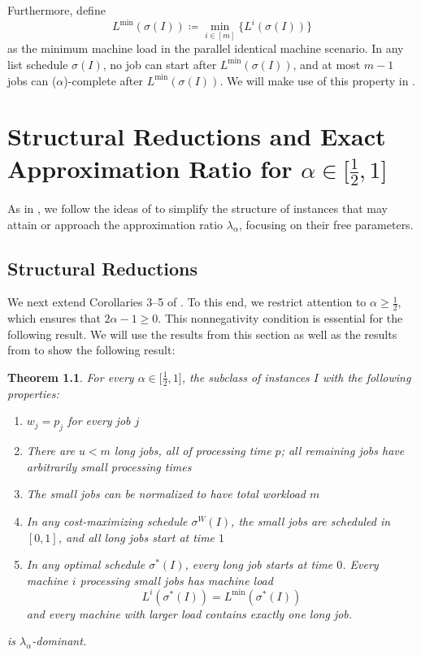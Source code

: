 \documentclass[%
english, titlepage=false %
]{./tum-templates/book/tumbook}
\newtheorem{theorem}{Theorem}
\newcommand{\machLoad}{L^{i}(\sigma(I))}
\newcommand{\machLoadMin}{L^{\min}(\sigma(I))}
\begin{document}
Furthermore, define
\[
        \machLoadMin \coloneqq \min_{i \in [m]} \{\machLoad\}
\]
as the minimum machine load in the parallel identical machine scenario.
In any list schedule $\sigma(I)$, no job can start after $\machLoadMin$, and at most
$m-1$ jobs can ($\alpha$)-complete after $\machLoadMin$.
We will make use of this property in .


\chapter{Structural Reductions and Exact Approximation Ratio for
\texorpdfstring{$\alpha \in \Big[\frac12,1\Big]$}{alpha in [1/2,1]}}\label{chap:alpha_g}

As in , we follow the ideas of \cite{Schwiegelshohn:2011}
to simplify the structure of instances that may attain or approach the
approximation ratio $\lambda_{\alpha}$, focusing on their free parameters.
\section{Structural Reductions}
We next extend Corollaries 3–5 of \cite{Schwiegelshohn:2011}. 
To this end, we restrict attention to \(\alpha \ge \frac12\), 
which ensures that \(2\alpha-1\ge 0\). This nonnegativity condition 
is essential for the following result. We will use the results from this section
as well as the results from  to show the following result:


\begin{theorem}\label{th: firstframed}
For every \(\alpha\in\Big[\frac12,1\Big]\), the
subclass of instances \(I\) with the
following properties:
\begin{enumerate}[label=(\roman*)]
    \item \(w_j=p_j\) for every job \(j\)

    \item There are \(u<m\) long jobs, all of processing time \(p\);
          all remaining jobs have arbitrarily small processing times

    \item The small jobs can be normalized to have total workload \(m\)

    \item In any cost-maximizing schedule \(\sigma^{W}(I)\), the small jobs are scheduled in
          \([0,1]\), and all long jobs start at time \(1\)

    \item In any optimal schedule \(\sigma^{*}(I)\), every long job starts at time \(0\).
          Every machine $i$ processing small jobs has machine load
          \[
              L^{i}(\sigma^{*}(I))
              =
              L^{\min}(\sigma^{*}(I))
          \]
            and every machine with larger load contains exactly one long job.
\end{enumerate}
is \(\lambda_\alpha\)-dominant.
\end{theorem}
\end{document}
